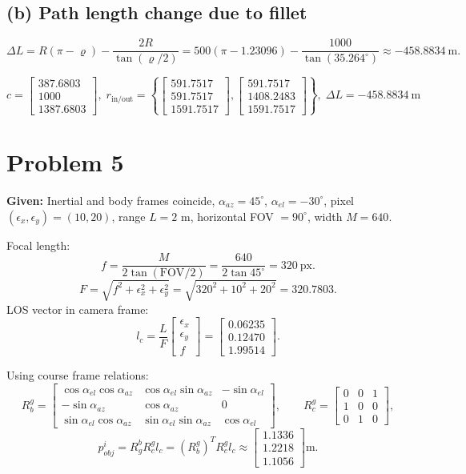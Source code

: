 \documentclass[11pt,a4paper]{article}
\begin{document}
\subsection*{(b) Path length change due to fillet}
\[
\Delta L=R(\pi-\varrho)-\frac{2R}{\tan(\varrho/2)}
=500( \pi-1.23096)-\frac{1000}{\tan(35.264^\circ)}
\approx -458.8834~\text{m}.
\]

\[
\boxed{
c=\begin{bmatrix}387.6803\\1000\\1387.6803\end{bmatrix},\;
r_{\text{in/out}}=\left\{
\begin{bmatrix}591.7517\\591.7517\\1591.7517\end{bmatrix},
\begin{bmatrix}591.7517\\1408.2483\\1591.7517\end{bmatrix}
\right\},\;
\Delta L=-458.8834~\text{m}
}
\]

\section{Problem 5}
\textbf{Given:}
Inertial and body frames coincide, $\alpha_{az}=45^\circ$, $\alpha_{el}=-30^\circ$, pixel $(\epsilon_x,\epsilon_y)=(10,20)$, range $L=2$ m, horizontal FOV $=90^\circ$, width $M=640$.

Focal length:
\[
f=\frac{M}{2\tan(\text{FOV}/2)}=\frac{640}{2\tan45^\circ}=320~\text{px}.
\]
\[
F=\sqrt{f^2+\epsilon_x^2+\epsilon_y^2}
=\sqrt{320^2+10^2+20^2}=320.7803.
\]
LOS vector in camera frame:
\[
l_c=\frac{L}{F}\begin{bmatrix}\epsilon_x\\ \epsilon_y\\ f\end{bmatrix}
=\begin{bmatrix}0.06235\\0.12470\\1.99514\end{bmatrix}.
\]

Using course frame relations:
\[
R_b^g=
\begin{bmatrix}
\cos\alpha_{el}\cos\alpha_{az} & \cos\alpha_{el}\sin\alpha_{az} & -\sin\alpha_{el}\\
-\sin\alpha_{az} & \cos\alpha_{az} & 0\\
\sin\alpha_{el}\cos\alpha_{az} & \sin\alpha_{el}\sin\alpha_{az} & \cos\alpha_{el}
\end{bmatrix},
\qquad
R_c^g=
\begin{bmatrix}
0&0&1\\1&0&0\\0&1&0
\end{bmatrix},
\]
\[
p_{obj}^i=R_g^bR_c^g l_c=(R_b^g)^TR_c^g l_c
\approx
\begin{bmatrix}
1.1336\\1.2218\\1.1056
\end{bmatrix}\text{m}.
\]
\end{document}
